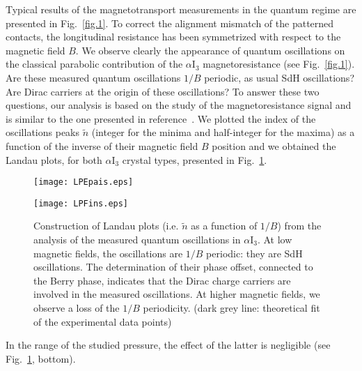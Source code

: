 \documentclass[doublecol]{epl2}
\begin{document}
Typical results of the magnetotransport measurements in the quantum regime are presented in Fig.~\ref{fig.1}. To correct the alignment mismatch of the patterned contacts, the longitudinal resistance has been symmetrized with respect to the magnetic field $B$. We observe clearly the appearance of quantum oscillations on the classical parabolic contribution of the $\alpha$I$_{3}$ magnetoresistance (see Fig.~\ref{fig.1}). Are these measured quantum oscillations $1/B$ periodic, as usual SdH oscillations? Are Dirac carriers at the origin of these oscillations? To answer these two questions, our analysis is based on the study of the magnetoresistance signal and is similar to the one presented in reference~\cite{alphaSdHOscillations}. We plotted the index of the oscillations peaks $\tilde{n}$ (integer for the minima and half-integer for the maxima) as a function of the inverse of their magnetic field $B$ position and we obtained the Landau plots, for both $\alpha$I$_{3}$ crystal types, presented in Fig.~\ref{fig.2}. 
\begin{figure}
\begin{center}
\texttt{[image: LPEpais.eps]}

\texttt{[image: LPFins.eps]}
\end{center}
\vspace{-0.3cm}
\caption{Construction of Landau plots (i.e. $\tilde{n}$ as a function of $1/B$) from the analysis of the measured quantum oscillations in $\alpha$I$_{3}$. At low magnetic fields, the oscillations are $1/B$ periodic: they are SdH oscillations. The determination of their phase offset, connected to the Berry phase, indicates that the Dirac charge carriers are involved in the measured oscillations. At higher magnetic fields, we observe a loss of the $1/B$ periodicity. (dark grey line: theoretical fit of the experimental data points)}
\label{fig.2}
\end{figure}
In the range of the studied pressure, the effect of the latter is negligible (see Fig.~\ref{fig.2}, bottom).
\end{document}
